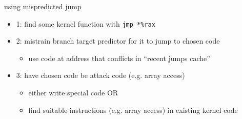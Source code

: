 \begin{frame}[fragile]{using mispredicted jump}
\begin{itemize}
\item 1: find some kernel function with \lstinline|jmp *%rax|
\item 2: mistrain branch target predictor for it to jump to chosen code
    \begin{itemize}
    \item use code at address that conflicts in ``recent jumps cache''
    \end{itemize}
\item 3: have chosen code be attack code (e.g. array access)
    \begin{itemize}
    \item either write special code OR
    \item find suitable instructions (e.g. array access) in existing kernel code
    \end{itemize}
\end{itemize}
\end{frame}

